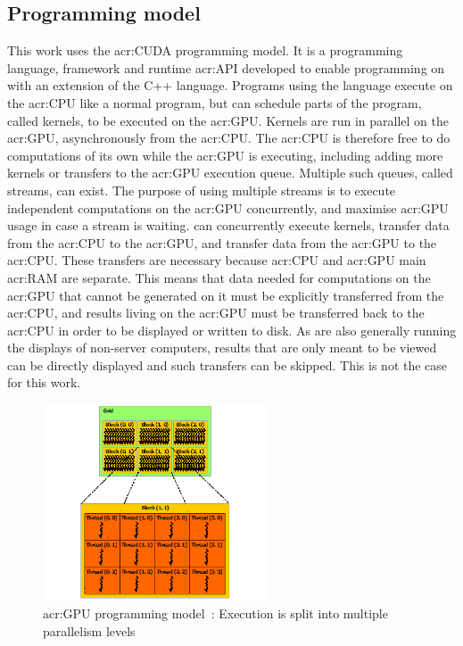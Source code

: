 \subsection{Programming model}\label{subsection:graphics_processing_units:architecture:programming_model}

This work uses the \acrshort{acr:CUDA} programming model. It is a programming language, framework
and runtime \acrfull{acr:API} developed to enable programming on  with an
extension of the C++ language. Programs using the language execute on the \acrshort{acr:CPU} like a
normal program, but can schedule parts of the program, called kernels, to be executed on the
\acrshort{acr:GPU}. Kernels are run in parallel on the \acrshort{acr:GPU}, asynchronously from the
\acrshort{acr:CPU}. The \acrshort{acr:CPU} is therefore free to do computations of its own while the
\acrshort{acr:GPU} is executing, including adding more kernels or transfers to the
\acrshort{acr:GPU} execution queue. Multiple such queues, called streams, can exist. The purpose of
using multiple streams is to execute independent computations on the \acrshort{acr:GPU}
concurrently, and maximise \acrshort{acr:GPU} usage in case a stream is waiting.
 can concurrently execute kernels, transfer data from the \acrshort{acr:CPU} to
the \acrshort{acr:GPU}, and transfer data from the \acrshort{acr:GPU} to the \acrshort{acr:CPU}.
These transfers are necessary because \acrshort{acr:CPU} and \acrshort{acr:GPU} main
\acrlong{acr:RAM} are separate. This means that data needed for computations on the
\acrshort{acr:GPU} that cannot be generated on it must be explicitly transferred from the
\acrshort{acr:CPU}, and results living on the \acrshort{acr:GPU} must be transferred back to the
\acrshort{acr:CPU} in order to be displayed or written to disk. As  are also
generally running the displays of non-server computers, results that are only meant to be viewed can
be directly displayed and such transfers can be skipped. This is not the case for this work. 

\begin{figure}[H]
	\centering
	\includegraphics[width=0.6\textwidth]{Chapter_graphics_processing_units/media/grid-of-thread-blocks}
	\caption{\Acrshort{acr:GPU} programming model~\cite{Nvidia2021}: Execution is split into multiple parallelism levels}\label{fig:gpu_programming_model}
\end{figure}

